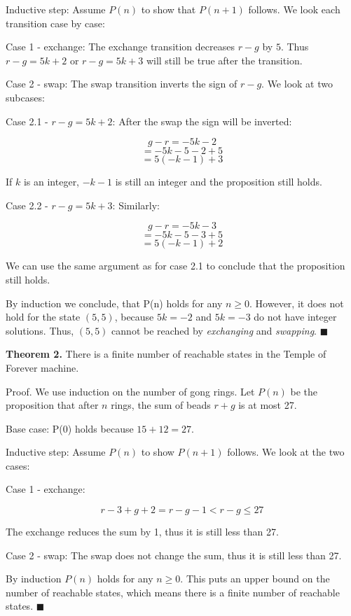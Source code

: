 \documentclass[../main.tex]{subfiles}
\begin{document}
\begin{questions}
\begin{solution}
    Inductive step: Assume $P(n)$ to show that $P(n+1)$ follows. We look each transition case by case:

    Case 1 - exchange: The exchange transition decreases $r-g$ by $5$. Thus $r-g=5k+2$ or $r-g=5k+3$ will still be true after the transition.

    Case 2 - swap: The swap transition inverts the sign of $r-g$. We look at two subcases:

    Case 2.1 - $r-g=5k+2$: After the swap the sign will be inverted:

    $$
    g-r = -5k-2
    $$
    $$
    = -5k-5-2+5
    $$
    $$
    = 5(-k-1)+3
    $$

    If $k$ is an integer, $-k-1$ is still an integer and the proposition still holds.

    Case 2.2 - $r-g=5k+3$: Similarly:

    $$
    g-r = -5k-3
    $$
    $$
    = -5k-5-3+5
    $$
    $$
    = 5(-k-1)+2
    $$

    We can use the same argument as for case 2.1 to conclude that the proposition still holds.

    By induction we conclude, that P(n) holds for any $n \ge 0$. However, it does not hold for the state $(5, 5)$, because $5k = -2$ and $5k = -3$ do not have integer solutions. Thus, $(5, 5)$ cannot be reached by \textit{exchanging} and \textit{swapping}. $\blacksquare$

    \textbf{Theorem 2.} There is a finite number of reachable states in the Temple of Forever machine.

    Proof. We use induction on the number of gong rings. Let $P(n)$ be the proposition that after $n$ rings, the sum of beads $r+g$ is at most 27.

    Base case: P(0) holds because $15+12 = 27$.

    Inductive step: Assume $P(n)$ to show $P(n+1)$ follows. We look at the two cases:

    Case 1 - exchange:

    $$
    r-3+g+2 = r-g-1 < r-g \le 27
    $$

    The exchange reduces the sum by 1, thus it is still less than 27.

    Case 2 - swap: The swap does not change the sum, thus it is still less than 27.

    By induction $P(n)$ holds for any $n \ge 0$. This puts an upper bound on the number of reachable states, which means there is a finite number of reachable states. $\blacksquare$


\end{solution}
\end{questions}
\end{document}
